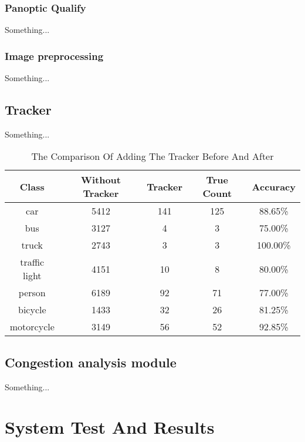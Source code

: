 \documentclass[10pt, conference, compsocconf]{IEEEtran}
\begin{document}
	\subsubsection{Panoptic Qualify}

	Something...
	
	\subsubsection{Image preprocessing}
	
	Something...
	
	\subsection{Tracker}
	
	Something...
	
	\begin{table}[!h]
		\renewcommand{\arraystretch}{1.3}
		\caption{The Comparison Of Adding The Tracker Before And After}
		\centering
		\begin{tabular}{ccccc} \\
			\hline
			Class & Without Tracker & Tracker & True Count & Accuracy\\
			\hline
			car & 5412 & 141 & 125 & 88.65\% \\
			\hline
			bus & 3127 & 4 & 3 & 75.00\% \\
			\hline
			truck & 2743 & 3 & 3 & 100.00\% \\
			\hline
			traffic light & 4151 & 10 & 8 & 80.00\% \\
			\hline
			person & 6189 & 92 & 71 & 77.00\% \\
			\hline
			bicycle & 1433 & 32 & 26 & 81.25\% \\
			\hline
			motorcycle & 3149 & 56 & 52 & 92.85\% \\
			\hline
		\end{tabular}
		
	\end{table}
	
	\subsection{Congestion analysis module}
	
	Something...
	
	\section{System Test And Results}
	
\end{document}
